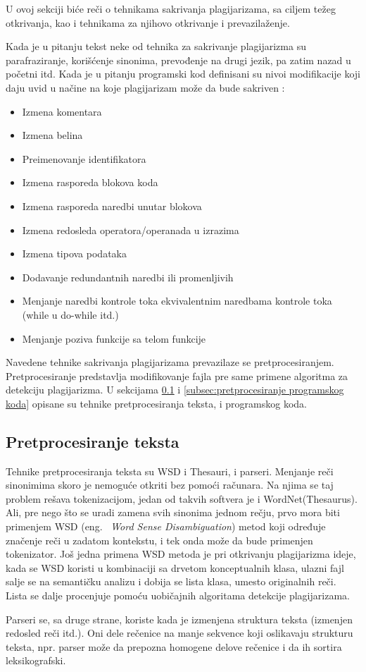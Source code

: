 \documentclass[a4paper]{article}
\begin{document}
U ovoj sekciji biće reči o tehnikama sakrivanja plagijarizama, sa ciljem težeg otkrivanja, kao i tehnikama za njihovo otkrivanje i prevazilaženje.
\par Kada je u pitanju tekst neke od tehnika za sakrivanje plagijarizma su parafraziranje, korišćenje sinonima, prevođenje na drugi jezik, pa zatim nazad u početni itd. Kada je u pitanju programski kod definisani su nivoi modifikacije koji daju uvid u načine na koje plagijarizam može da bude sakriven \cite{joyluck}:

\begin{itemize}
\item Izmena komentara
\item Izmena belina
\item Preimenovanje identifikatora
\item Izmena rasporeda blokova koda
\item Izmena rasporeda naredbi unutar blokova
\item Izmena redosleda operatora/operanada u izrazima
\item Izmena tipova podataka
\item Dodavanje redundantnih naredbi ili promenljivih
\item Menjanje naredbi kontrole toka ekvivalentnim naredbama kontrole toka (while u do-while itd.)
\item Menjanje poziva funkcije sa telom funkcije
\end{itemize}

Navedene tehnike sakrivanja plagijarizama prevazilaze se pretprocesiranjem. Pretprocesiranje predstavlja modifikovanje fajla pre same primene algoritma za detekciju plagijarizma. U sekcijama \ref{subsec:pretprocesiranje teksta} i \ref{subsec:pretprocesiranje programskog koda} opisane su tehnike pretprocesiranja teksta, i programskog koda.

\subsection{Pretprocesiranje teksta}
\label{subsec:pretprocesiranje teksta}

Tehnike pretprocesiranja teksta su WSD i Thesauri, i parseri. Menjanje reči sinonimima skoro je nemoguće otkriti bez pomoći računara. Na njima se taj problem rešava tokenizacijom, jedan od takvih softvera je i WordNet(Thesaurus). Ali, pre nego što se uradi zamena svih sinonima jednom rečju, prvo mora biti primenjem WSD (eng. ~{\em Word Sense Disambiguation}) metod koji određuje značenje reči u zadatom kontekstu, i tek onda može da bude primenjen tokenizator. Još jedna primena WSD metoda je pri otkrivanju plagijarizma ideje, kada se WSD koristi u kombinaciji sa drvetom konceptualnih klasa, ulazni fajl salje se na semantičku analizu i dobija se lista klasa, umesto originalnih reči. Lista se dalje procenjuje pomoću uobičajnih algoritama detekcije plagijarizama. \par Parseri se, sa druge strane, koriste kada je izmenjena struktura teksta (izmenjen redosled reči itd.). Oni dele rečenice na manje sekvence koji oslikavaju strukturu teksta, npr. parser može da prepozna homogene delove rečenice i da ih sortira leksikografski.
\end{document}
